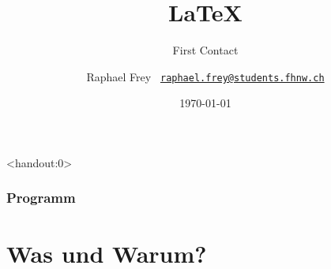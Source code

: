 \documentclass{beamer}                %
\title{\vspace*{4em}\Huge\LaTeX}
\subtitle{\hfill First Contact}
\date{\today}
\author{%
    Raphael Frey%
    \hfill%
    \scriptsize\texttt{%
        \href{mailto:raphael.frey@students.fhnw.ch}%
        {raphael.frey@students.fhnw.ch}}}
\begin{document}
                                                              

\frame[plain]{\titlepage} %


\begin{frame}<handout:0> %
    \frametitle{Programm}
    \tableofcontents
\end{frame}


\section<handout:0>{Was und Warum?} %
\end{document}
